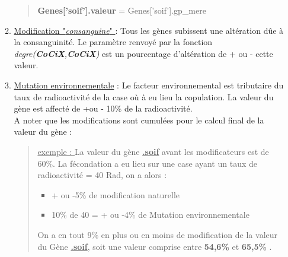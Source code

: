 \documentclass[french]{report}
\newlength{\du}\fi
\begin{document}
\begin{itemize}
\begin{enumerate}
\begin{quote}
			\textbf{Genes['soif'].valeur} = Genes['soif'].gp\_mere\\
			
		\end{quote}
		\item \underline{Modification "\textit{consanguine}" } : Tous les gènes subissent une altération dûe à la consanguinité. Le paramètre renvoyé par la fonction \textit{degre(\textbf{CoCiX},\textbf{CoCiX})} est un pourcentage d'altération  de + ou - cette valeur.\\
		
		\item \underline{Mutation environnementale} : Le facteur environnemental est tributaire du taux de radioactivité de la case où à eu lieu la copulation. La valeur du gène est affecté de +ou - 10\% de la radioactivité.\\
		
		A noter que les modifications sont cumulées pour le calcul final de la valeur du gène :\\
		\begin{quote}
			\underline{exemple : }
			La valeur du gène \underline{\textbf{.soif}} avant les modificateurs est de 60\%. La fécondation a eu lieu sur une case ayant un taux de radioactivité = 40 Rad, on a alors :\\
			\begin{itemize}
				\item + ou -5\% de modification naturelle\\
				\item 10\% de 40 =  + ou -4\% de Mutation environnementale\\
			\end{itemize}
			On a en tout 9\% en plus ou en moins de modification de la valeur du Gène \textbf{\underline{.soif}}, soit une valeur comprise entre \textbf{54,6\% }et \textbf{65,5\%} .\\
			

\end{quote}
\end{enumerate}
\end{itemize}
\end{document}
